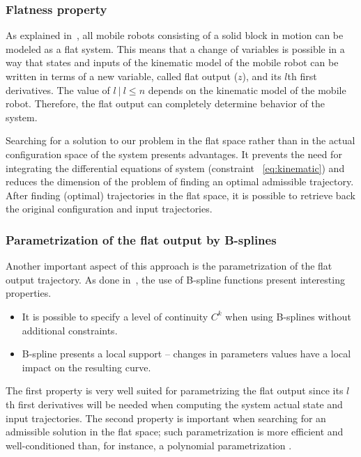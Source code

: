 \documentclass[eprint]{actapoly}
\begin{document}
\subsubsection{Flatness property}

As explained in~\cite{Defoort2007a}, all mobile robots consisting of a solid
block in motion can be modeled as a flat system. 
This means that a change of variables is possible in a way that states and
inputs of the kinematic model of the mobile robot can be written in terms
of a new variable, called flat output ($z$), and its $l$th first derivatives.
The value of $l\ |\ l \leq n$ depends on the kinematic model of the mobile robot.
Therefore, the flat output can completely determine behavior of the system.


Searching for a solution to our problem in the flat space rather than in
the actual configuration space of the system presents advantages.
It prevents the need for integrating the differential equations
of system (constraint ~\ref{eq:kinematic}) and reduces the dimension of the 
problem of finding an optimal admissible trajectory.
After finding (optimal) trajectories in the flat space, it is possible
to retrieve back the original configuration and input trajectories.

\subsubsection{Parametrization of the flat output by B-splines}

Another important aspect of this approach is the parametrization of 
the flat output trajectory. As done in~\cite{Milam2003}, the use
of B-spline functions present interesting properties.
\begin{itemize}


 \item It is possible to specify a level of continuity $C^k$ when using
 B-splines without additional constraints.
 
 \item B-spline presents a local support -- changes in parameters values have a 
 local impact on the resulting curve.
 
 
\end{itemize}
The first property is very well suited for parametrizing the flat output since
its $l$th first derivatives will be needed when computing the system actual state
and input trajectories. The second property is important when searching for an
admissible solution in the flat space; such parametrization is more efficient
and well-conditioned than, for instance, a polynomial parametrization \cite{Milam2003}.
\end{document}
